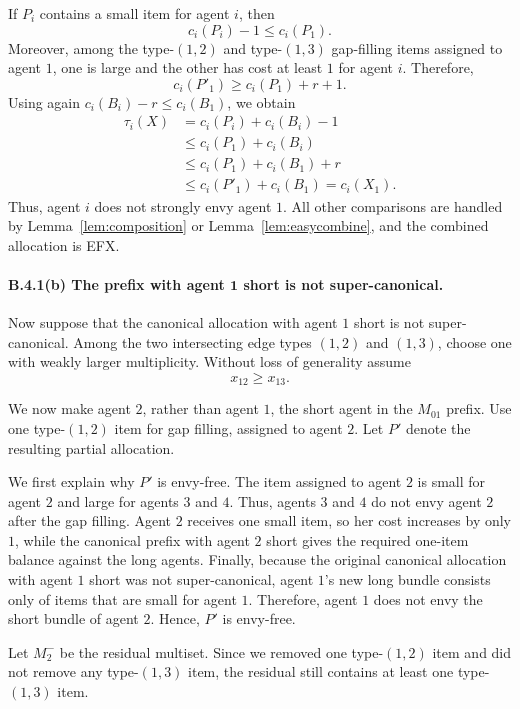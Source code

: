 \documentclass{article}
\theoremstyle{definition}
\begin{document}
If $P_i$ contains a small item for agent $i$, then
\[
    c_i(P_i)-1\le c_i(P_1).
\]
Moreover, among the type-$(1,2)$ and type-$(1,3)$ gap-filling items assigned
to agent $1$, one is large and the other has cost at least $1$ for agent $i$.
Therefore,
\[
    c_i(P'_1)\ge c_i(P_1)+r+1.
\]
Using again $c_i(B_i)-r\le c_i(B_1)$, we obtain
\[
\begin{aligned}
    \tau_i(X)
    &=c_i(P_i)+c_i(B_i)-1 \\
    &\le c_i(P_1)+c_i(B_i) \\
    &\le c_i(P_1)+c_i(B_1)+r \\
    &\le c_i(P'_1)+c_i(B_1)
    =c_i(X_1).
\end{aligned}
\]
Thus, agent $i$ does not strongly envy agent $1$.  All other comparisons are
handled by Lemma~\ref{lem:composition} or Lemma~\ref{lem:easycombine}, and the
combined allocation is EFX.

\paragraph{B.4.1(b) The prefix with agent $\boldsymbol{1}$ short is not super-canonical.}
Now suppose that the canonical allocation with agent $1$ short is not
super-canonical.  Among the two intersecting edge types $(1,2)$ and $(1,3)$,
choose one with weakly larger multiplicity.  Without loss of generality assume
\[
    x_{12}\ge x_{13}.
\]

We now make agent $2$, rather than agent $1$, the short agent in the
$M_{01}$ prefix.  Use one type-$(1,2)$ item for gap filling, assigned to
agent $2$.  Let $P'$ denote the resulting partial allocation.

We first explain why $P'$ is envy-free.  The item assigned to agent $2$ is
small for agent $2$ and large for agents $3$ and $4$.  Thus, agents $3$ and
$4$ do not envy agent $2$ after the gap filling.  Agent $2$ receives one small
item, so her cost increases by only $1$, while the canonical prefix with
agent $2$ short gives the required one-item balance against the long agents.
Finally, because the original canonical allocation with agent $1$ short was
not super-canonical, agent $1$'s new long bundle consists only of items that
are small for agent $1$.  Therefore, agent $1$ does not envy the short bundle
of agent $2$.  Hence, $P'$ is envy-free.

Let $M_2^-$ be the residual multiset.  Since we removed one type-$(1,2)$ item
and did not remove any type-$(1,3)$ item, the residual still contains at least
one type-$(1,3)$ item.
\end{document}
